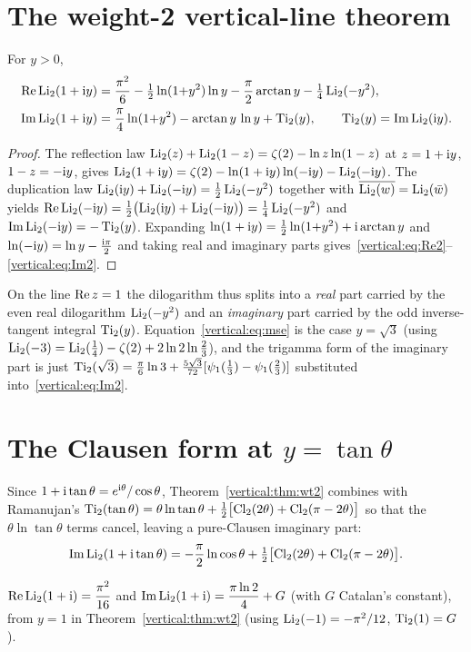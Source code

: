 \section{The weight-2 vertical-line theorem}
\begin{theorem}\label{vertical:thm:wt2}
For $y>0$,
\begin{align}
  \operatorname{Re}\operatorname{Li}_2(1+\mathrm{i} y)&=\frac{\pi^2}{6}-\tfrac12\ln(1{+}y^2)\ln y-\frac\pi2\arctan y-\tfrac14\operatorname{Li}_2(-y^2),
  \label{vertical:eq:Re2}\\
  \operatorname{Im}\operatorname{Li}_2(1+\mathrm{i} y)&=\frac\pi4\ln(1{+}y^2)-\arctan y\,\ln y+\operatorname{Ti}_2(y),\qquad \operatorname{Ti}_2(y)=\operatorname{Im}\operatorname{Li}_2(\mathrm{i} y).
  \label{vertical:eq:Im2}
\end{align}
\end{theorem}
\begin{proof}
The reflection law $\operatorname{Li}_2(z)+\operatorname{Li}_2(1-z)=\zeta(2)-\ln z\ln(1-z)$ at $z=1+\mathrm{i} y$, $1-z=-\mathrm{i} y$, gives
$\operatorname{Li}_2(1+\mathrm{i} y)=\zeta(2)-\ln(1+\mathrm{i} y)\ln(-\mathrm{i} y)-\operatorname{Li}_2(-\mathrm{i} y)$. The duplication law
$\operatorname{Li}_2(\mathrm{i} y)+\operatorname{Li}_2(-\mathrm{i} y)=\tfrac12\operatorname{Li}_2(-y^2)$ together with $\overline{\operatorname{Li}_2(w)}=\operatorname{Li}_2(\bar w)$ yields
$\operatorname{Re}\operatorname{Li}_2(-\mathrm{i} y)=\tfrac12\bigl(\operatorname{Li}_2(\mathrm{i} y)+\operatorname{Li}_2(-\mathrm{i} y)\bigr)=\tfrac14\operatorname{Li}_2(-y^2)$ and
$\operatorname{Im}\operatorname{Li}_2(-\mathrm{i} y)=-\operatorname{Ti}_2(y)$. Expanding $\ln(1+\mathrm{i} y)=\tfrac12\ln(1{+}y^2)+\mathrm{i}\arctan y$ and
$\ln(-\mathrm{i} y)=\ln y-\tfrac{\mathrm{i}\pi}2$ and taking real and imaginary parts gives~\eqref{vertical:eq:Re2}--\eqref{vertical:eq:Im2}.
\end{proof}
On the line $\operatorname{Re} z=1$ the dilogarithm thus splits into a \emph{real} part carried by the even real
dilogarithm $\operatorname{Li}_2(-y^2)$ and an \emph{imaginary} part carried by the odd inverse-tangent integral
$\operatorname{Ti}_2(y)$. Equation~\eqref{vertical:eq:mse} is the case $y=\sqrt3$ (using
$\operatorname{Li}_2(-3)=\operatorname{Li}_2(\tfrac14)-\zeta(2)+2\ln2\ln\tfrac23$), and the trigamma form of the imaginary part is just
$\operatorname{Ti}_2(\sqrt3)=\tfrac{\pi}6\ln3+\tfrac{5\sqrt3}{72}[\psi_1(\tfrac13)-\psi_1(\tfrac23)]$ substituted
into~\eqref{vertical:eq:Im2}.

\section{The Clausen form at $y=\tan\theta$}
Since $1+\mathrm{i}\tan\theta=e^{\mathrm{i}\theta}/\cos\theta$, Theorem~\ref{vertical:thm:wt2} combines with Ramanujan's
$\operatorname{Ti}_2(\tan\theta)=\theta\ln\tan\theta+\tfrac12\bigl[\operatorname{Cl}_2(2\theta)+\operatorname{Cl}_2(\pi-2\theta)\bigr]$ so that the
$\theta\ln\tan\theta$ terms cancel, leaving a pure-Clausen imaginary part:
\begin{equation}\label{vertical:eq:clausen}
  \operatorname{Im}\operatorname{Li}_2(1+\mathrm{i}\tan\theta)=-\frac\pi2\ln\cos\theta+\tfrac12\bigl[\operatorname{Cl}_2(2\theta)+\operatorname{Cl}_2(\pi-2\theta)\bigr].
\end{equation}
\begin{corollary}\label{vertical:cor:specials}
$\operatorname{Re}\operatorname{Li}_2(1+\mathrm{i})=\dfrac{\pi^2}{16}$ and $\operatorname{Im}\operatorname{Li}_2(1+\mathrm{i})=\dfrac{\pi\ln2}{4}+G$ (with $G$ Catalan's
constant), from $y=1$ in Theorem~\ref{vertical:thm:wt2} (using $\operatorname{Li}_2(-1)=-\pi^2/12$, $\operatorname{Ti}_2(1)=G$).
\end{corollary}

